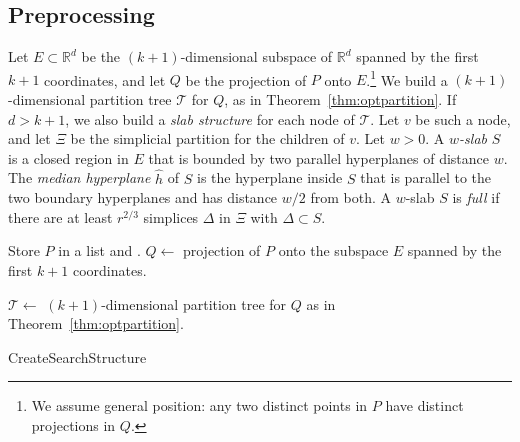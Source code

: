 \documentclass[a4paper,11pt]{paper}
\newcommand{\mathset}[1]{\ensuremath {\mathbb {#1}}}
\newcommand{\R}{\mathset{R}}
\newenvironment{alg}{\begin{algorithm}[htbp]}{\end{algorithm}}
\begin{document}
\subsection{Preprocessing}
\label{sec:lowdimpreproc}

Let $E \subset \R^d$ be the $(k+1)$-dimensional subspace of $\R^d$
spanned by the first $k+1$ coordinates, and let $Q$ be the
projection of $P$ onto $E$.\footnote{We assume general position:
any two distinct points in $P$ have distinct projections in $Q$.}
We build a $(k+1)$-dimensional partition tree $\mathcal{T}$
for $Q$, as in Theorem~\ref{thm:optpartition}.
If $d > k + 1$, we also build a \emph{slab structure}
for each node of $\mathcal{T}$.
Let $v$ be such a node, and let $\Xi$ be the simplicial partition
for the children of $v$.
Let $w > 0$. A \emph{$w$-slab} $S$ is a closed region in $E$ that is
bounded by two parallel hyperplanes of distance $w$.
The \emph{median hyperplane} $\widehat{h}$ of $S$ is the
hyperplane inside $S$ that is parallel to the
two boundary hyperplanes and has distance $w/2$ from both.
A $w$-slab $S$ is \emph{full} if there are at least $r^{2/3}$
simplices $\Delta$ in $\Xi$ with $\Delta \subset S$.

\begin{alg}
\Input{point set $P \subset \R^d$}
 {
Store $P$ in a list and \Return.
}
$Q \gets$ projection of $P$ onto the subspace $E$ spanned by the
first $k+1$ coordinates.

$\mathcal{T} \gets $ $(k+1)$-dimensional partition tree for $Q$ as
in Theorem~\ref{thm:optpartition}.

 {
}
 \caption{CreateSearchStructure}
 \label{alg:createpartitionstructure}
\end{alg}
\end{document}
